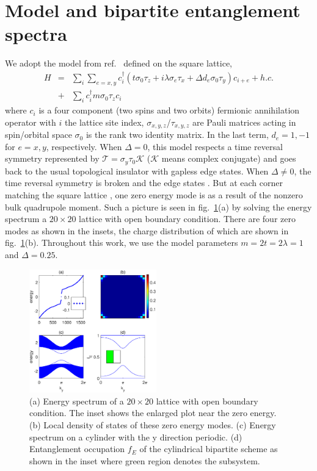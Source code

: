 \documentclass[doublecol]{epl2} %
\begin{document}
\section{Model and bipartite entanglement spectra}

We adopt the model from ref.~\cite{Schindler_SA_2018} defined on the square lattice,
\begin{eqnarray} \label{eq:model}
H &=& \sum_{i}\sum_{e=x,y} c_i^\dag\left( t\sigma_0\tau_z + i\lambda \sigma_e\tau_x + \Delta d_e \sigma_0\tau_y \right)c_{i+e} + h.c. \nonumber\\ 
&+& \sum_i c_i^\dag m\sigma_0 \tau_z c_i
\end{eqnarray}
where $c_i$ is a four component (two spins and two orbits) fermionic annihilation operator with $i$ the lattice site index, $\sigma_{x,y,z}$/$\tau_{x,y,z}$ are Pauli matrices acting in spin/orbital space  $\sigma_0$ is the rank two identity matrix. In the last term, $d_e=1,-1$ for $e=x,y$, respectively. When $\Delta=0$, this model respects a time reversal symmetry represented by $\mathcal{T}=\sigma_y\tau_0\mathcal{K}$ ($\mathcal{K}$ means complex conjugate) and goes back to the usual topological insulator with gapless edge states. \cite{Qi_PRB_2008} When $\Delta\ne0$, the time reversal symmetry is broken and the edge states . But at each corner matching the square lattice , one zero energy mode is  as a result of the nonzero bulk quadrupole moment. \cite{Benalcazar_S_2017} Such a picture is seen in fig.~\ref{fig:model}(a) by solving the energy spectrum  a $20\times20$ lattice with  open boundary condition. There are four zero modes as shown in the insets, the charge distribution of which are shown in fig.~\ref{fig:model}(b). Throughout this work, we use the model parameters $m=2t=2\lambda=1$ and $\Delta=0.25$. 

\begin{figure}
	\includegraphics[width=0.49\textwidth]{model.eps}
	\caption{\label{fig:model} (a) Energy spectrum of a $20\times20$ lattice with open boundary condition. The inset shows the enlarged plot near the zero energy. (b) Local density of states of these zero energy modes. (c) Energy spectrum on a cylinder with the y direction periodic. (d) Entanglement occupation $f_E$ of the cylindrical bipartite scheme as shown in the inset where green region denotes the subsystem. }
\end{figure}
\end{document}
